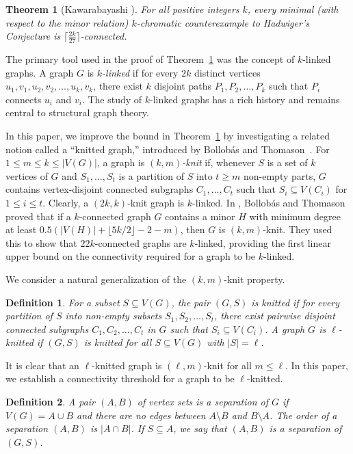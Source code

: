 \documentclass[11pt]{amsart}
\newtheorem{theorem}{Theorem}
\newtheorem{definition}{Definition}
\begin{document}
\begin{theorem}[Kawarabayashi \cite{K07}]\label{K-thm}
For all positive integers $k$, every minimal (with respect to the minor relation) $k$-chromatic counterexample to Hadwiger's Conjecture is $\lceil \frac{2k}{27}\rceil$-connected.
\end{theorem}

The primary tool used in the proof of Theorem~\ref{K-thm} was the concept of $k$-linked graphs. A graph $G$ is \emph{$k$-linked} if for every $2k$ distinct vertices $u_1, v_1, u_2, v_2, \ldots, u_k,v_k$, there exist $k$ disjoint paths $P_1, P_2, \ldots, P_k$ such that $P_i$ connects $u_i$ and $v_i$. The study of $k$-linked graphs has a rich history and remains central to structural graph theory.

In this paper, we improve the bound in Theorem~\ref{K-thm} by investigating a related notion called a ``knitted graph,'' introduced by Bollob\'as and Thomason~\cite{BT96}. For $1\le m\le k\le |V(G)|$, a graph is \emph{$(k,m)$-knit} if, whenever $S$ is a set of $k$ vertices of $G$ and $S_1, \ldots, S_t$ is a partition of $S$ into $t\ge m$ non-empty parts, $G$ contains vertex-disjoint connected subgraphs $C_1, \ldots, C_t$ such that $S_i\subseteq V(C_i)$ for $1\le i\le t$. Clearly, a $(2k, k)$-knit graph is $k$-linked. In \cite{BT96}, Bollob\'as and Thomason proved that if a $k$-connected graph $G$ contains a minor $H$ with minimum degree at least $0.5(|V(H)|+\lfloor 5k/2\rfloor-2-m)$, then $G$ is $(k, m)$-knit. They used this to show that $22k$-connected graphs are $k$-linked, providing the first linear upper bound on the connectivity required for a graph to be $k$-linked.

We consider a natural generalization of the $(k,m)$-knit property. 

\begin{definition}
For a subset $S\subseteq V(G)$, the pair \emph{$(G, S)$ is knitted} if for every partition of $S$ into non-empty subsets $S_1, S_2, \ldots, S_t$, there exist pairwise disjoint connected subgraphs $C_1, C_2, \ldots, C_t$ in $G$ such that $S_i\subseteq V(C_i)$. A graph $G$ is \emph{$\ell$-knitted} if $(G,S)$ is knitted for all $S\subseteq V(G)$ with $|S|=\ell$.
\end{definition}

It is clear that an $\ell$-knitted graph is $(\ell, m)$-knit for all $m\le \ell$. In this paper, we establish a connectivity threshold for a graph to be $\ell$-knitted.

\begin{definition}\label{separation}
A pair $(A, B)$ of vertex sets is a \emph{separation} of $G$ if $V(G)=A\cup B$ and there are no edges between $A\setminus B$ and $B\setminus A$. The \emph{order} of a separation $(A, B)$ is $|A\cap B|$. If $S\subseteq A$, we say that $(A,B)$ is a separation of $(G,S)$. 
\end{definition}
\end{document}
